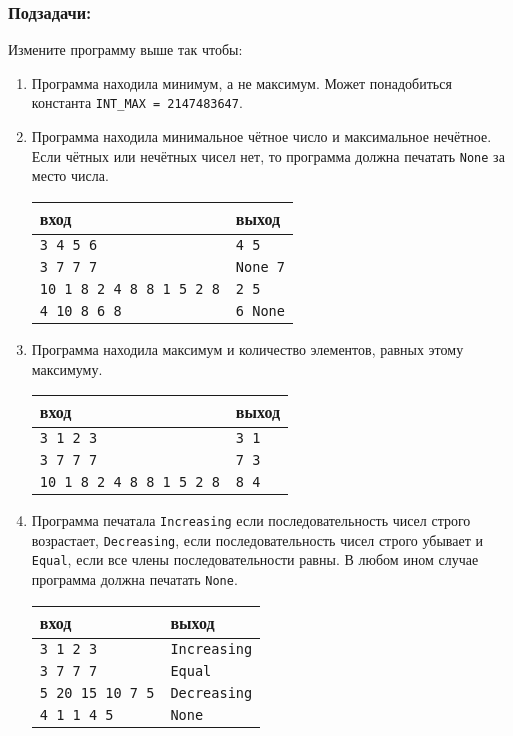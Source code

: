 \documentclass{article}
\begin{document}
\subsubsection*{Подзадачи:}
Измените программу выше так чтобы:
\begin{enumerate}
\item Программа находила минимум, а не максимум. Может понадобиться константа \texttt{INT\_MAX = 2147483647}.
\item Программа находила минимальное чётное число и максимальное нечётное. Если чётных или нечётных чисел нет, то программа должна печатать \texttt{None} за место числа.
\begin{center}
\begin{tabular}{ l l }
 вход & выход \\ \hline
 \texttt{3 4 5 6} & \texttt{4 5}  \\ 
 \texttt{3 7 7 7} & \texttt{None 7}  \\
 \texttt{10 1 8 2 4 8 8 1 5 2 8} & \texttt{2 5} \\
 \texttt{4 10 8 6 8} & \texttt{6 None}
\end{tabular}
\end{center}
\item Программа находила максимум и количество элементов, равных этому максимуму.
\begin{center}
\begin{tabular}{ l l }
 вход & выход \\ \hline
 \texttt{3 1 2 3} & \texttt{3 1}  \\ 
 \texttt{3 7 7 7} & \texttt{7 3}  \\
 \texttt{10 1 8 2 4 8 8 1 5 2 8} & \texttt{8 4}
\end{tabular}
\end{center}

\item Программа печатала \texttt{Increasing} если последовательность чисел строго возрастает, \texttt{Decreasing}, если последовательность чисел строго убывает и \texttt{Equal}, если все члены последовательности равны. В любом ином случае программа должна печатать \texttt{None}.
\begin{center}
\begin{tabular}{ l l }
 вход & выход \\ \hline
 \texttt{3 1 2 3} & \texttt{Increasing}  \\ 
 \texttt{3 7 7 7} & \texttt{Equal}  \\
 \texttt{5 20 15 10 7 5} & \texttt{Decreasing}  \\ 
 \texttt{4 1 1 4 5} & \texttt{None}
\end{tabular}
\end{center}
\end{enumerate}
\end{document}
